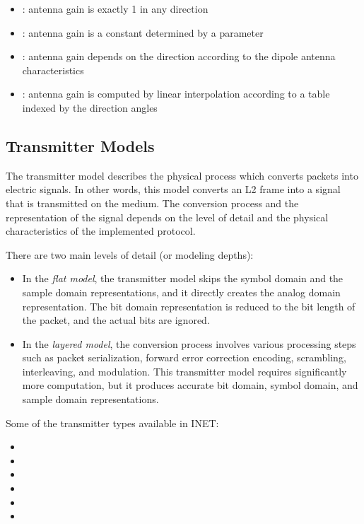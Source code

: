 \begin{itemize}
  \item {}: antenna gain is exactly 1 in any direction
  \item {}: antenna gain is a constant determined by
    a parameter
  \item {}: antenna gain depends on the direction according
    to the dipole antenna characteristics
  \item {}: antenna gain is computed by linear
    interpolation according to a table indexed by the direction angles
\end{itemize}

\subsection{Transmitter Models}

The transmitter model describes the physical process which converts packets into
electric signals. In other words, this model converts an L2 frame into a signal
that is transmitted on the medium. The conversion process and the representation
of the signal depends on the level of detail and the physical characteristics
of the implemented protocol.

There are two main levels of detail (or modeling depths):
 
\begin{itemize}
\item In the \textit{flat model}, the transmitter model skips the symbol domain 
and the sample domain representations, and it directly creates the analog domain 
representation. The bit domain representation is reduced to the bit length of 
the packet, and the actual bits are ignored.

\item In the \textit{layered model}, the conversion process involves various 
processing steps such as packet serialization, forward error correction encoding, 
scrambling, interleaving, and modulation. This transmitter model requires 
significantly more computation, but it produces accurate bit domain, 
symbol domain, and sample domain representations.
\end{itemize}

Some of the transmitter types available in INET:

\begin{itemize}
  \item {}
  \item {}
  \item {}
  \item {}
  \item {}
  \item {}
\end{itemize}


